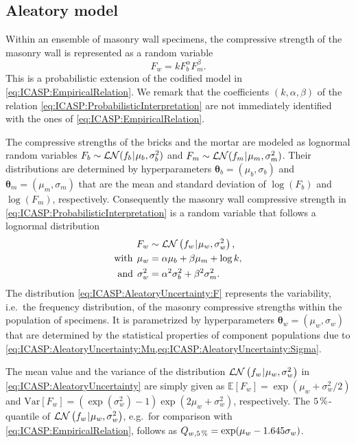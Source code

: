 \subsection{Aleatory model}
Within an ensemble of masonry wall specimens, the compressive strength of the masonry wall is represented as a random variable
\begin{equation} \label{eq:ICASP:ProbabilisticInterpretation}
  F_w = k F_b^\alpha F_m^\beta.
\end{equation}
This is a probabilistic extension of the codified model in \cref{eq:ICASP:EmpiricalRelation}.
We remark that the coefficients \((k,\alpha,\beta)\) of the relation \cref{eq:ICASP:ProbabilisticInterpretation} are not immediately identified with the ones of \cref{eq:ICASP:EmpiricalRelation}.
\par %
The compressive strengths of the bricks and the mortar are modeled as lognormal random variables \(F_b \sim \mathcal{LN}(f_b {\:\!}|{\:\!} \mu_b,\sigma_b^2)\) and \(F_m \sim \mathcal{LN}(f_m {\:\!}|{\:\!} \mu_m,\sigma_m^2)\).
Their distributions are determined by hyperparameters \(\bm{\theta}_b = (\mu_b,\sigma_b)\) and \(\bm{\theta}_m = (\mu_m,\sigma_m)\) that are the mean and standard deviation of \(\log(F_b)\) and \(\log(F_m)\), respectively.
Consequently the masonry wall compressive strength in \cref{eq:ICASP:ProbabilisticInterpretation} is a random variable that follows a lognormal distribution
\begin{subequations} \label{eq:ICASP:AleatoryUncertainty}
  \begin{align}
    F_w &\sim \mathcal{LN} \left( f_w {\:\!}|{\:\!} \mu_w,\sigma_w^2 \right), \label{eq:ICASP:AleatoryUncertainty:F} \\
    \text{with} \;\, \mu_w &= \alpha \mu_b + \beta \mu_m + \log k, \label{eq:ICASP:AleatoryUncertainty:Mu} \\
    \text{and} \;\, \sigma_w^2 &= \alpha^2 \sigma_b^2 + \beta^2 \sigma_m^2. \label{eq:ICASP:AleatoryUncertainty:Sigma}
  \end{align}
\end{subequations}
The distribution \cref{eq:ICASP:AleatoryUncertainty:F} represents the variability, i.e.\ the frequency distribution, of the masonry compressive strengths within the population of specimens.
It is parametrized by hyperparameters \(\bm{\theta}_w = (\mu_w,\sigma_w)\) that are determined by the statistical properties of component populations due to \cref{eq:ICASP:AleatoryUncertainty:Mu,eq:ICASP:AleatoryUncertainty:Sigma}.
\par %
The mean value and the variance of the distribution \(\mathcal{LN} \left( f_w {\:\!}|{\:\!} \mu_w,\sigma_w^2 \right)\) in \cref{eq:ICASP:AleatoryUncertainty} are simply given as
\(\mathds{E}[F_w] = \exp(\mu_w + \sigma_w^2/2)\) and \(\textrm{Var}[F_w] = (\exp(\sigma_w^2)-1) \exp(2\mu_w+\sigma_w^2)\), respectively.
The \(\unit[5]{\%}\)-quantile of  \(\mathcal{LN} \left( f_w {\:\!}|{\:\!} \mu_w,\sigma_w^2 \right)\), e.g.\ for comparison with \cref{eq:ICASP:EmpiricalRelation}, follows as \(Q_{w,\unit[5]{\%}} = \exp(\mu_w-1.645 \sigma_w)\).

